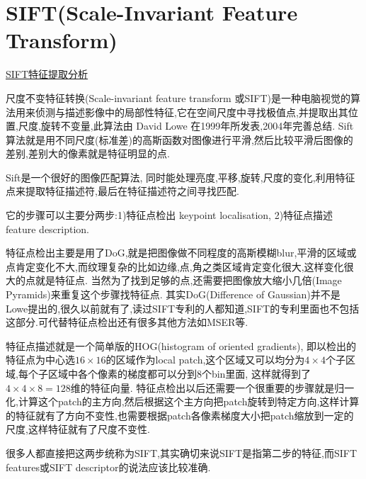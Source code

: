 \chapter{SIFT(Scale-Invariant Feature Transform)}
\href{http://blog.csdn.net/abcjennifer/article/details/7639681/}{SIFT特征提取分析}

尺度不变特征转换(Scale-invariant feature transform 或SIFT)是一种电脑视觉的算法用来侦测与描述影像中的局部性特征,它在空间尺度中寻找极值点,并提取出其位置,尺度,旋转不变量,此算法由 David Lowe 在1999年所发表,2004年完善总结.
Sift算法就是用不同尺度(标准差)的高斯函数对图像进行平滑,然后比较平滑后图像的差别,差别大的像素就是特征明显的点.

Sift是一个很好的图像匹配算法, 同时能处理亮度,平移,旋转,尺度的变化,利用特征点来提取特征描述符,最后在特征描述符之间寻找匹配.

它的步骤可以主要分两步:1)特征点检出 keypoint localisation, 2)特征点描述 feature description.

特征点检出主要是用了DoG,就是把图像做不同程度的高斯模糊blur,平滑的区域或点肯定变化不大,而纹理复杂的比如边缘,点,角之类区域肯定变化很大,这样变化很大的点就是特征点.
当然为了找到足够的点,还需要把图像放大缩小几倍(Image Pyramids)来重复这个步骤找特征点.
其实DoG(Difference of Gaussian)并不是Lowe提出的,很久以前就有了,读过SIFT专利的人都知道,SIFT的专利里面也不包括这部分.可代替特征点检出还有很多其他方法如MSER等.

特征点描述就是一个简单版的HOG(histogram of oriented gradients), 即以检出的特征点为中心选$16 \times 16$的区域作为local patch,这个区域又可以均分为$4 \times 4$个子区域,每个子区域中各个像素的梯度都可以分到$8$个bin里面,
这样就得到了$4 \times 4 \times 8 = 128$维的特征向量.
特征点检出以后还需要一个很重要的步骤就是归一化,计算这个patch的主方向,然后根据这个主方向把patch旋转到特定方向,这样计算的特征就有了方向不变性,也需要根据patch各像素梯度大小把patch缩放到一定的尺度,这样特征就有了尺度不变性.

很多人都直接把这两步统称为SIFT,其实确切来说SIFT是指第二步的特征,而SIFT features或SIFT descriptor的说法应该比较准确.

